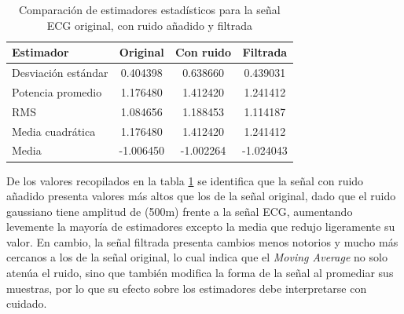 \documentclass[twocolumn]{IEEEtran}
\begin{document}
\begin{table}[!ht]
    \centering
    \caption{Comparación de estimadores estadísticos para la señal ECG original, con ruido añadido y filtrada}
    \label{tab:ecg_stats}
    \begin{tabular}{lccc}
        \hline
        \textbf{Estimador} & \textbf{Original} & \textbf{Con ruido} & \textbf{Filtrada} \\
        \hline
        Desviación estándar & 0.404398  & 0.638660  & 0.439031 \\
        Potencia promedio   & 1.176480  & 1.412420  & 1.241412
 \\
        RMS                 & 1.084656  & 1.188453  & 1.114187
\\
        Media cuadrática    & 1.176480  & 1.412420  & 1.241412
 \\
        Media               & -1.006450 & -1.002264 & -1.024043\\
        \hline
    \end{tabular}
\end{table}

De los valores recopilados en la tabla \ref{tab:ecg_stats} se identifica que la señal con ruido añadido presenta valores más altos que los de la señal 
original, dado que el ruido gaussiano tiene amplitud de (500m) frente a la 
señal ECG, aumentando levemente la mayoría de estimadores excepto la media que redujo ligeramente su valor. En 
cambio, la señal filtrada presenta cambios menos notorios y mucho más cercanos a los de la señal original,
lo cual indica que el \textit{Moving Average} no solo atenúa el ruido, sino que 
también modifica la forma de la señal al promediar sus muestras, por lo que su 
efecto sobre los estimadores debe interpretarse con cuidado.
\end{document}
